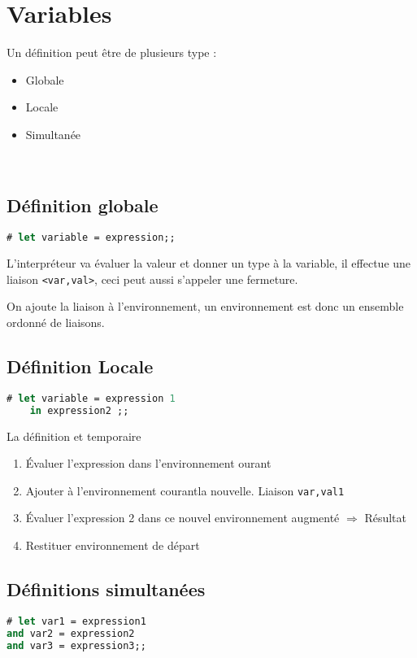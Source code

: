 \documentclass[12pt,a4paper,openany]{book}
\begin{document}
	\section{Variables}
	Un définition peut être de plusieurs type : 
	\begin{itemize}
		\item Globale
		\item Locale
		\item Simultanée
	\end{itemize}
~
	\subsection{Définition globale}
	\begin{lstlisting}[language=Caml, caption=Définition de variable]
# let variable = expression;;
	\end{lstlisting}
	L'interpréteur va évaluer la valeur et donner un type à la variable, il effectue une liaison \texttt{<var,val>}, ceci peut aussi s'appeler une
	fermeture.

	On ajoute la liaison à l'environnement, un environnement est donc un ensemble ordonné de liaisons.
	\subsection{Définition Locale}
	\begin{lstlisting}[language=Caml, caption=Définition de variable]
# let variable = expression 1
	in expression2 ;;
	\end{lstlisting}
	La définition et temporaire
	\begin{enumerate}
		\item Évaluer l'expression dans l'environnement ourant
		\item Ajouter à l'environnement courantla nouvelle. Liaison \texttt{var,val1}
		\item Évaluer l'expression 2 dans ce nouvel environnement augmenté $\Rightarrow$ Résultat
		\item Restituer environnement de départ
	\end{enumerate}

	\subsection{Définitions simultanées}
	\begin{lstlisting}[language=Caml, caption=Définition de variable]
# let var1 = expression1 
and var2 = expression2
and var3 = expression3;;
\end{lstlisting}
	
\end{document}
